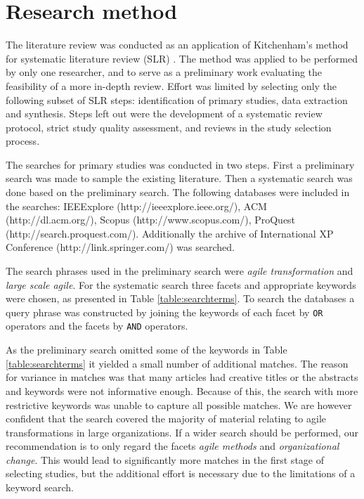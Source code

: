 \documentclass[lnbip]{svmultln}
\begin{document}
\section{Research method}
\label{sec:method}

%
%
%


The literature review was conducted as an application of Kitchenham's
method for systematic literature review (SLR) . The method
was applied to be performed by only one researcher, and to serve as a
preliminary work evaluating the feasibility of a more in-depth review.
Effort was limited by selecting only the following subset of SLR steps:
identification of primary studies, data extraction and synthesis. Steps left out
were the development of a systematic review protocol, strict study quality
assessment, and reviews in the study selection process.

The searches for primary studies was conducted in two steps. First a preliminary
search was made to sample the existing literature. Then a systematic search was
done based on the preliminary search. The following databases were included in
the searches: IEEExplore (http://ieeexplore.ieee.org/),
ACM (http://dl.acm.org/), Scopus (http://www.scopus.com/),
ProQuest \linebreak (http://search.proquest.com/).
Additionally the archive of International XP
Conference (http://link.springer.com/) was searched.

The search phrases used in the preliminary search were \textit{agile
transformation} and \textit{large scale agile}. For the systematic search three
facets and appropriate keywords were chosen, as presented in Table
\ref{table:searchterms}. To search the databases a query phrase was constructed
by joining the keywords of each facet by \texttt{OR} operators and the facets by
\texttt{AND} operators.

As the preliminary search omitted some of the keywords in Table
\ref{table:searchterms} it yielded a small number of additional matches. The
reason for variance in matches was that many articles had creative titles or the
abstracts and keywords were not informative enough. Because of this, the search
with more restrictive keywords was unable to capture all possible matches.
We are however confident that the search covered the majority of material
relating to agile transformations in large organizations. If a wider search
should be performed, our recommendation is to only regard the facets
\textit{agile methods} and \textit{organizational change}. This would lead to
significantly more matches in the first stage of selecting studies, but the
additional effort is necessary due to the limitations of a keyword search.
\end{document}
